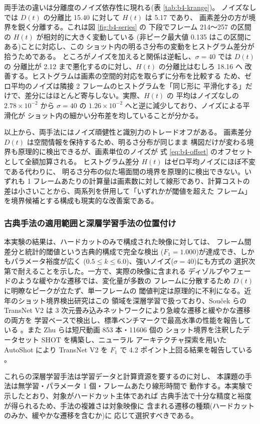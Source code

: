 両手法の違いは分離度のノイズ依存性に現れる(表 \ref{tab:b4-krange})。
ノイズなしでは $D(t)$ の分離比 15.40 に対して $H(t)$ は 5.17 であり、
画素差分の方が境界を鋭く分離する。これは図 \ref{fig:b4-series} の
下段でフレーム 214〜257 の区間の $H(t)$ が相対的に大きく変動している
(非ピーク最大値 0.135 はこの区間にある)ことに対応し、この
ショット内の明るさ分布の変動をヒストグラム差分が拾うためである。
ところがノイズを加えると関係は逆転し、$\sigma = 40$ では $D(t)$ の
分離比が 2.12 まで悪化するのに対し、$H(t)$ の分離比はむしろ 18.16 へ
改善する。ヒストグラムは画素の空間的対応を取らずに分布を比較する
ため、ゼロ平均のノイズは隣接 2 フレームのヒストグラムを「同じ形に
平滑化する」だけで、差分にはほとんど寄与しない。実際、$H(t)$ の
平均はノイズなしの $2.78 \times 10^{-2}$ から $\sigma = 40$ の
$1.26 \times 10^{-2}$ へと逆に減少しており、ノイズによる平滑化が
ショット内の細かい分布差を均していることが分かる。

以上から、両手法にはノイズ頑健性と識別力のトレードオフがある。
画素差分 $D(t)$ は空間情報を保持するため、明るさ分布が同じまま
構図だけが変わる境界も原理的に検出できるが、画素単位のノイズが
式 \ref{eq:b4-offset} のオフセットとして全額加算される。
ヒストグラム差分 $H(t)$ はゼロ平均ノイズにほぼ不変である代わりに、
明るさ分布の似た場面間の境界を原理的に検出できない。いずれも
1 フレームあたりの計算量は画素数に対して線形であり、計算コストの
差は小さいことから、両系列を併用して「いずれかが閾値を超えた
フレーム」を境界候補とする構成も現実的な改善案である。

\subsubsection{古典手法の適用範囲と深層学習手法の位置付け}

本実験の結果は、ハードカットのみで構成された映像に対しては、
フレーム間差分と統計的閾値という古典的構成で完全な検出
($F_1 = 1.000$)が達成でき、しかもパラメータ裕度が広く
($0.5 \le k \le 6.0$)、強いノイズ($\sigma = 40$)にも方式の
選択次第で耐えることを示した。一方で、実際の映像に含まれる
ディゾルブやフェードのような緩やかな遷移では、変化量が多数の
フレームに分散するため $D(t)$ に明瞭なピークが立たず、単一フレームの
閾値判定は原理的に不利になる。近年のショット境界検出研究はこの
領域を深層学習で扱っており、Sou\v{c}ek らの TransNet V2 は
3 次元畳み込みネットワークにより急峻な遷移と緩やかな遷移の両方を
学習ベースで検出し、標準ベンチマークで最高水準の性能を報告している
\cite{b4-transnetv2}。また Zhu らは短尺動画 853 本・11606 個の
ショット境界を注釈したデータセット SHOT を構築し、ニューラル
アーキテクチャ探索を用いた AutoShot により TransNet V2 を
$F_1$ で 4.2 ポイント上回る結果を報告している \cite{b4-autoshot}。

これらの深層学習手法は学習データと計算資源を要するのに対し、
本課題の手法は無学習・パラメータ 1 個・フレームあたり線形時間で
動作する。本実験で示したとおり、対象がハードカット主体であれば
古典手法で十分な精度と裕度が得られるため、手法の複雑さは対象映像に
含まれる遷移の種類(ハードカットのみか、緩やかな遷移を含むか)に
応じて選択すべきである。
